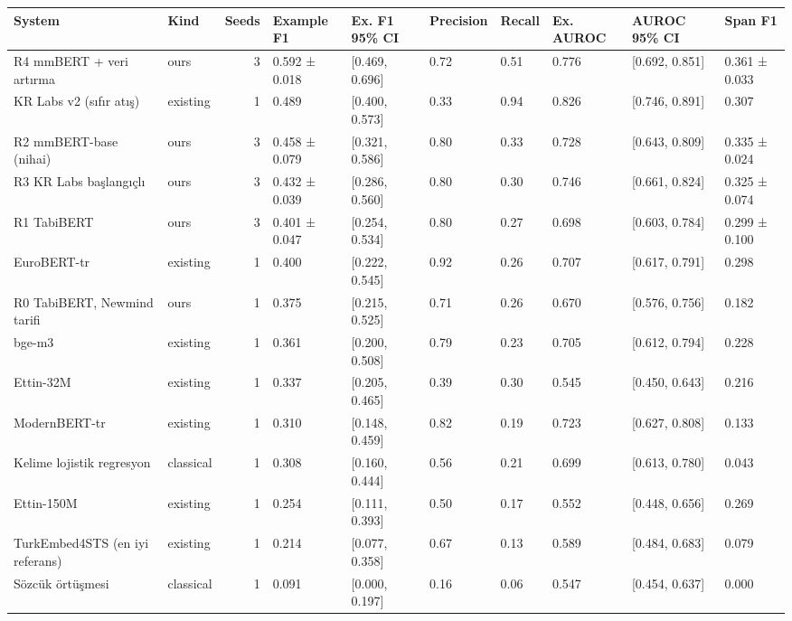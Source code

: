 \begin{tabular}{llrlllllll}
\toprule
System & Kind & Seeds & Example F1 & Ex. F1 95\% CI & Precision & Recall & Ex. AUROC & AUROC 95\% CI & Span F1 \\
\midrule
R4 mmBERT + veri artırma & ours & 3 & 0.592 ± 0.018 & [0.469, 0.696] & 0.72 & 0.51 & 0.776 & [0.692, 0.851] & 0.361 ± 0.033 \\
KR Labs v2 (sıfır atış) & existing & 1 & 0.489 & [0.400, 0.573] & 0.33 & 0.94 & 0.826 & [0.746, 0.891] & 0.307 \\
R2 mmBERT-base (nihai) & ours & 3 & 0.458 ± 0.079 & [0.321, 0.586] & 0.80 & 0.33 & 0.728 & [0.643, 0.809] & 0.335 ± 0.024 \\
R3 KR Labs başlangıçlı & ours & 3 & 0.432 ± 0.039 & [0.286, 0.560] & 0.80 & 0.30 & 0.746 & [0.661, 0.824] & 0.325 ± 0.074 \\
R1 TabiBERT & ours & 3 & 0.401 ± 0.047 & [0.254, 0.534] & 0.80 & 0.27 & 0.698 & [0.603, 0.784] & 0.299 ± 0.100 \\
EuroBERT-tr & existing & 1 & 0.400 & [0.222, 0.545] & 0.92 & 0.26 & 0.707 & [0.617, 0.791] & 0.298 \\
R0 TabiBERT, Newmind tarifi & ours & 1 & 0.375 & [0.215, 0.525] & 0.71 & 0.26 & 0.670 & [0.576, 0.756] & 0.182 \\
bge-m3 & existing & 1 & 0.361 & [0.200, 0.508] & 0.79 & 0.23 & 0.705 & [0.612, 0.794] & 0.228 \\
Ettin-32M & existing & 1 & 0.337 & [0.205, 0.465] & 0.39 & 0.30 & 0.545 & [0.450, 0.643] & 0.216 \\
ModernBERT-tr & existing & 1 & 0.310 & [0.148, 0.459] & 0.82 & 0.19 & 0.723 & [0.627, 0.808] & 0.133 \\
Kelime lojistik regresyon & classical & 1 & 0.308 & [0.160, 0.444] & 0.56 & 0.21 & 0.699 & [0.613, 0.780] & 0.043 \\
Ettin-150M & existing & 1 & 0.254 & [0.111, 0.393] & 0.50 & 0.17 & 0.552 & [0.448, 0.656] & 0.269 \\
TurkEmbed4STS (en iyi referans) & existing & 1 & 0.214 & [0.077, 0.358] & 0.67 & 0.13 & 0.589 & [0.484, 0.683] & 0.079 \\
Sözcük örtüşmesi & classical & 1 & 0.091 & [0.000, 0.197] & 0.16 & 0.06 & 0.547 & [0.454, 0.637] & 0.000 \\
\bottomrule
\end{tabular}
